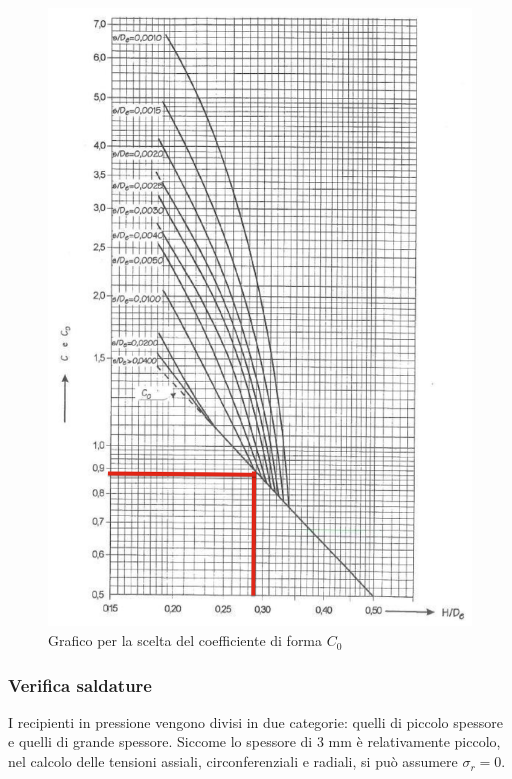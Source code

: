 \begin{figure}[h]
    \centering
    \includegraphics[scale=0.5]{Immagini/GraficoC0.png}
    \caption{Grafico per la scelta del coefficiente di forma $C_0$}
    \label{fig:GraficoC0}
\end{figure}
\subsubsection{Verifica saldature}
I recipienti in pressione vengono divisi in due categorie: quelli di piccolo spessore e quelli di grande spessore. 
Siccome lo spessore di 3 mm è relativamente piccolo, nel calcolo delle tensioni assiali, circonferenziali e radiali, si può assumere $\sigma_r=0$.
